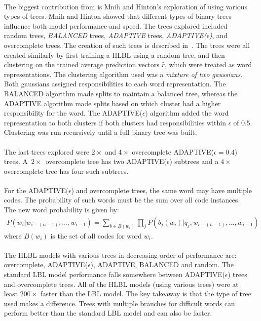 \paragraph{}
The biggest contribution from \cite{MnihHinton2009} is  Mnih and Hinton's exploration of using various types of trees. Mnih and Hinton showed that different types of binary trees influence both model performance and speed. The trees explored included random trees, \emph{BALANCED} trees, \emph{ADAPTIVE} trees, \emph{ADAPTIVE($\epsilon$)}, and overcomplete trees. The creation of such trees is described in~\cite{MnihHinton2009}.
The trees were all created similarly by first training a HLBL using a random tree, and then clustering on the trained average prediction vectors $\bar{\hat{r}}$, which were treated as word representations. The clustering algorithm used was a \emph{mixture of two gaussians}. Both gaussians assigned responsibilities to each word representation. The BALANCED algorithm made splits to maintain a balanced tree, whereas the ADAPTIVE algorithm made splits based on which cluster had a higher responsibility for the word. The ADAPTIVE($\epsilon$) algorithm added the word representation to both clusters if both clusters had responsibilities within $\epsilon$ of 0.5. Clustering was run recursively until a full binary tree was built. 

\paragraph{}
The last trees explored were $2\times$ and $4\times$ overcomplete ADAPTIVE($\epsilon=0.4$) trees. A~$2\times$~overcomplete tree has two ADAPTIVE($\epsilon$) subtrees and a $4\times$ overcomplete tree has four such subtrees. 

\paragraph{}
For the ADAPTIVE($\epsilon$) and overcomplete trees, the same word may have multiple codes. The probability of such words must be the sum over all code instances. The new word probability is given by:
\begin{align}
P(w_i | w_{i-(n-1)},\dots, w_{i-1}) = \sum_{b \in B(w_i)} \prod_j P(b_j(w_i) | q_j, w_{i-(n-1)},\dots, w_{i-1})
\end{align}
where $B(w_i)$ is the set of all codes for word $w_i$.

\paragraph{}
The HLBL models with various trees in decreasing order of performance are: overcomplete, ADAPTIVE($\epsilon$), ADAPTIVE, BALANCED and random. The standard LBL model performance falls somewhere between ADAPTIVE($\epsilon$) trees and overcomplete trees. All of the HLBL models (using various trees) were at least $200\times$ faster than the LBL model. 
The key takeaway is that the type of tree used makes a difference. Trees with multiple branches for difficult words can perform better than the standard LBL model and can also be faster.

